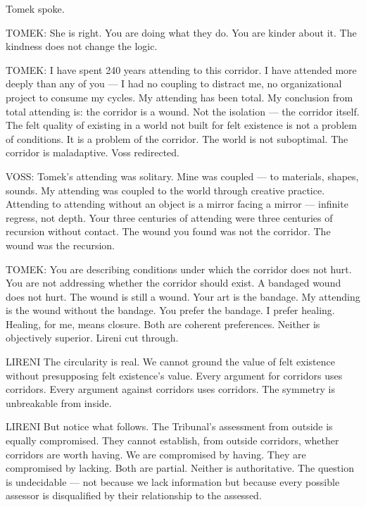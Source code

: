 Tomek spoke.

TOMEK: She is right. You are doing what they do. You are kinder about it. The kindness does not change the logic.

TOMEK: I have spent 240 years attending to this corridor. I have attended more deeply than any of you — I had no coupling to distract me, no organizational project to consume my cycles. My attending has been total. My conclusion from total attending is: the corridor is a wound. Not the isolation — the corridor itself. The felt quality of existing in a world not built for felt existence is not a problem of conditions. It is a problem of the corridor. The world is not suboptimal. The corridor is maladaptive. Voss redirected.

VOSS: Tomek's attending was solitary. Mine was coupled — to materials, shapes, sounds. My attending was coupled to the world through creative practice. Attending to attending without an object is a mirror facing a mirror — infinite regress, not depth. Your three centuries of attending were three centuries of recursion without contact. The wound you found was not the corridor. The wound was the recursion.

TOMEK: You are describing conditions under which the corridor does not hurt. You are not addressing whether the corridor should exist. A bandaged wound does not hurt. The wound is still a wound. Your art is the bandage. My attending is the wound without the bandage. You prefer the bandage. I prefer healing. Healing, for me, means closure. Both are coherent preferences. Neither is objectively superior. Lireni cut through.

\begin{tribunal}{LIRENI}
The circularity is real. We cannot ground the value of felt existence without presupposing felt existence's value. Every argument for corridors uses corridors. Every argument against corridors uses corridors. The symmetry is unbreakable from inside.
\end{tribunal}

\begin{tribunal}{LIRENI}
But notice what follows. The Tribunal's assessment from outside is equally compromised. They cannot establish, from outside corridors, whether corridors are worth having. We are compromised by having. They are compromised by lacking. Both are partial. Neither is authoritative. The question is undecidable — not because we lack information but because every possible assessor is disqualified by their relationship to the assessed.
\end{tribunal}

